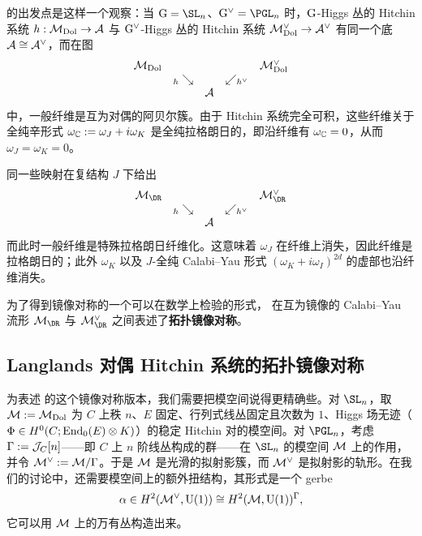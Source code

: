 \cite{hausel-thaddeus} 的出发点是这样一个观察：当 $\G=\SL_n$、$\G^\vee=\PGL_n$ 时，$\mathrm{G}$-Higgs 丛的 Hitchin 系统 $h:{\mathcal{M}}_{\mathrm{Dol}}\to {\mathcal A}$ 与 $\mathrm{G}^\vee$-Higgs 丛的 Hitchin 系统 ${\mathcal{M}}^\vee_{\mathrm{Dol}}\to {\mathcal{A}}^\vee$ 有同一个底 ${\mathcal{A}}\cong {\mathcal{A}}^\vee$，而在图
\begin{equation}\label{syzdol}
\begin{array}{rcccl}
{\mathcal{M}}_{\mathrm{Dol}} & & & & {\mathcal{M}}^\vee_{\mathrm{Dol}}\\
 & {}_{h} \searrow & & \swarrow_{h^\vee} & \\
 & & {\mathcal{A}} & &
\end{array}
\end{equation}
中，一般纤维是互为对偶的阿贝尔簇。由于 Hitchin 系统完全可积，这些纤维关于全纯辛形式 $\omega_{\mathbb{C}}:=\omega_J+i\omega_K$ 是全纯拉格朗日的，即沿纤维有 $\omega_{\mathbb{C}}=0$，从而 $\omega_J=\omega_K=0$。

同一些映射在复结构 $J$ 下给出
\begin{equation}\label{syzdr}
\begin{array}{rcccl}
\M_\DR & & & & \M^\vee_\DR\\
 & {}_{h} \searrow & & \swarrow_{h^\vee} & \\
 & & \calA & &
\end{array}
\end{equation}
而此时一般纤维是特殊拉格朗日纤维化。这意味着 $\omega_J$ 在纤维上消失，因此纤维是拉格朗日的；此外 $\omega_K$ 以及 $J$-全纯 Calabi--Yau 形式 $(\omega_K+i \omega_I)^{2d}$ 的虚部也沿纤维消失。

为了得到镜像对称的一个可以在数学上检验的形式，\cite{hausel-thaddeus} 在互为镜像的 Calabi--Yau 流形 $\M_{\DR}$ 与 $\M^\vee_{\DR}$ 之间表述了\textbf{拓扑镜像对称}。

\subsection{Langlands 对偶 Hitchin 系统的拓扑镜像对称}

为表述 \cite{hausel-thaddeus} 的这个镜像对称版本，我们需要把模空间说得更精确些。对 $\SL_n$，取 ${\mathcal{M}}:={\mathcal{M}}_{\mathrm{Dol}}$ 为 $C$ 上秩 $n$、$E$ 固定、行列式线丛固定且次数为 $1$、Higgs 场无迹（$\Phi\in H^0(C;\textnormal{End}_0(E)\otimes K)$）的稳定 Hitchin 对的模空间。对 $\PGL_n$，考虑 $\Gamma:={\mathcal J}_C[n]$——即 $C$ 上 $n$ 阶线丛构成的群——在 $\SL_n$ 的模空间 ${\mathcal{M}}$ 上的作用，并令 ${\mathcal{M}}^\vee:={\mathcal{M}}/\Gamma$。于是 ${\mathcal{M}}$ 是光滑的拟射影簇，而 ${\mathcal{M}}^\vee$ 是拟射影的轨形。在我们的讨论中，还需要模空间上的额外扭结构，其形式是一个 gerbe
\[
\alpha\in H^2({\mathcal{M}}^\vee,{\mathrm{U}}(1))\cong H^2({\mathcal{M}},{\mathrm{U}}(1))^\Gamma,
\]
它可以用 ${\mathcal{M}}$ 上的万有丛构造出来。


